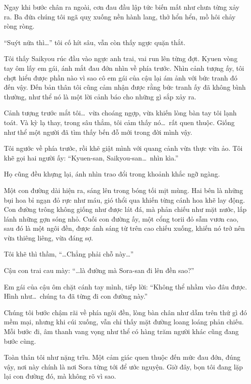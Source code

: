 \documentclass[../main.tex]{subfiles}
\begin{document}
Ngay khi bước chân ra ngoài, cơn đau đầu lập tức biến mất như chưa từng xảy ra. Ba đứa chúng tôi ngã quỵ xuống nền hành lang, thở hổn hển, mồ hôi chảy ròng ròng.

``Suýt nữa thì\dots'' tôi cố hít sâu, vẫn còn thấy ngực quặn thắt.

Tôi thấy Saikyou rúc đầu vào ngực anh trai, vai run lên từng đợt. Kyuen vòng tay ôm lấy em gái, ánh mắt đau đớn nhìn về phía trước. Nhìn cảnh tượng ấy, tôi chợt hiểu được phần nào vì sao cô em gái của cậu lại ám ảnh với bức tranh đó đến vậy. Đến bản thân tôi cũng cảm nhận được rằng bức tranh ấy đã không bình thường, như thể nó là một lời cảnh báo cho những gì sắp xảy ra.

Cảnh tượng trước mắt tôi\dots\ vừa choáng ngợp, vừa khiến lòng bàn tay tôi lạnh toát. Và kỳ lạ thay, trong sâu thẳm, tôi cảm thấy nó\dots\ rất quen thuộc. Giống như thể một người đã tìm thấy bến đỗ mới trong đời mình vậy.

Tôi ngước về phía trước, rồi khẽ giật mình với quang cảnh vừa thực vừa ảo. Tôi khẽ gọi hai người ấy: ``Kyuen-san, Saikyou-san\dots\ nhìn kìa.''

Họ cũng đều khựng lại, ánh nhìn trao đổi trong khoảnh khắc ngỡ ngàng.

Một con đường dài hiện ra, sáng lên trong bóng tối mịt mùng. Hai bên là những bụi hoa bỉ ngạn đỏ rực như máu, gió thổi qua khiến từng cánh hoa khẽ lay động. Con đường trông không giống như được lát đá, mà phản chiếu như mặt nước, lấp lánh những gợn sóng nhỏ. Cuối con đường ấy, một cổng torii đỏ sẫm vươn cao, sau đó là một ngôi đền, được ánh sáng từ trên cao chiếu xuống, khiến nó trở nên vừa thiêng liêng, vừa đáng sợ.


Tôi khẽ thì thầm, ``\dots Chẳng phải chỗ này\dots''

Cậu con trai cau mày: ``\dots là đường mà Sora-san đi lên đền sao?''

Em gái của cậu ôm chặt cánh tay mình, tiếp lời: ``Không thể nhầm vào đâu được. Hình như\dots\ chúng ta đã từng đi con đường này.''

Chúng tôi bước chậm rãi về phía ngôi đền, lòng bàn chân như dẫm trên thứ gì đó mềm mại, nhưng khi cúi xuống, vẫn chỉ thấy mặt đường loang loáng phản chiếu. Mỗi bước đi, âm thanh vang vọng như thể có hàng trăm người khác cũng đang bước cùng.

Toàn thân tôi như nặng trĩu. Một cảm giác quen thuộc đến mức đau đớn, đúng vậy, nơi này chính là nơi Sora từng tới để ước nguyện. Giờ đây, bọn tôi đang lặp lại con đường đó, mà không rõ vì sao.
\end{document}
